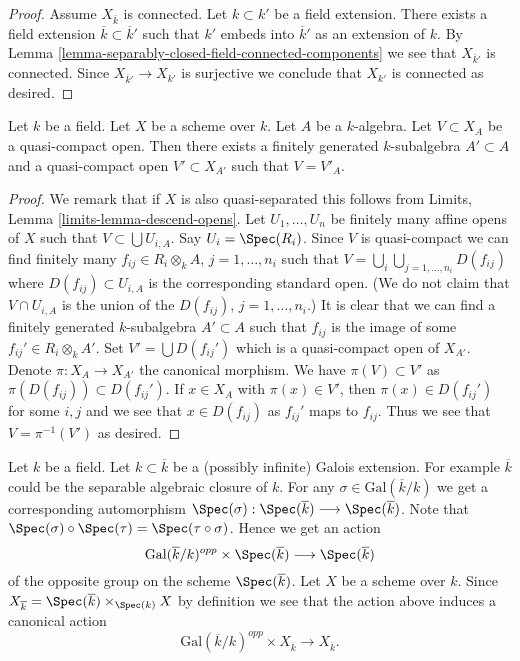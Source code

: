 \begin{proof}
Assume $X_{\overline{k}}$ is connected.
Let $k \subset k'$ be a field extension.
There exists a field extension $\overline{k} \subset \overline{k}'$
such that $k'$ embeds into $\overline{k}'$ as an extension of $k$.
By Lemma \ref{lemma-separably-closed-field-connected-components}
we see that $X_{\overline{k}'}$ is connected.
Since $X_{\overline{k}'} \to X_{k'}$ is surjective we conclude
that $X_{k'}$ is connected as desired.
\end{proof}

\begin{lemma}
\label{lemma-descend-open}
Let $k$ be a field.
Let $X$ be a scheme over $k$.
Let $A$ be a $k$-algebra.
Let $V \subset X_A$ be a quasi-compact open.
Then there exists a finitely generated $k$-subalgebra $A' \subset A$
and a quasi-compact open $V' \subset X_{A'}$
such that $V = V'_A$.
\end{lemma}

\begin{proof}
We remark that if $X$ is also quasi-separated this follows from
Limits, Lemma \ref{limits-lemma-descend-opens}. Let
$U_1, \ldots, U_n$ be finitely many affine opens of $X$
such that $V \subset \bigcup U_{i, A}$. Say $U_i = \Spec(R_i)$.
Since $V$ is quasi-compact we can find finitely many
$f_{ij} \in R_i \otimes_k A$, $j = 1, \ldots, n_i$
such that $V = \bigcup_i \bigcup_{j = 1, \ldots, n_i} D(f_{ij})$
where $D(f_{ij}) \subset U_{i, A}$ is the corresponding standard
open. (We do not claim that $V \cap U_{i, A}$ is the union
of the $D(f_{ij})$, $j = 1, \ldots, n_i$.)
It is clear that we can find a finitely generated $k$-subalgebra
$A' \subset A$ such that $f_{ij}$ is the image of some
$f_{ij}' \in R_i \otimes_k A'$.
Set $V' = \bigcup D(f_{ij}')$ which is a quasi-compact open of $X_{A'}$.
Denote $\pi : X_A \to X_{A'}$ the canonical morphism.
We have $\pi(V) \subset V'$ as $\pi(D(f_{ij})) \subset D(f_{ij}')$.
If $x \in X_A$ with $\pi(x) \in V'$, then $\pi(x) \in D(f_{ij}')$
for some $i, j$ and we see that $x \in D(f_{ij})$ as $f_{ij}'$
maps to $f_{ij}$. Thus we see that $V = \pi^{-1}(V')$ as desired.
\end{proof}

\noindent
Let $k$ be a field. Let $k \subset \overline{k}$ be a (possibly infinite)
Galois extension. For example $\overline{k}$ could be the
separable algebraic closure of $k$.
For any $\sigma \in \text{Gal}(\overline{k}/k)$ we get a corresponding
automorphism
$
\Spec(\sigma) :
\Spec(\overline{k})
\longrightarrow
\Spec(\overline{k})
$.
Note that
$\Spec(\sigma) \circ \Spec(\tau) = \Spec(\tau \circ \sigma)$.
Hence we get an action
$$
\text{Gal}(\overline{k}/k)^{opp} \times \Spec(\overline{k})
\longrightarrow
\Spec(\overline{k})
$$
of the opposite group on the scheme $\Spec(\overline{k})$.
Let $X$ be a scheme over $k$. Since
$X_{\overline{k}} =
\Spec(\overline{k}) \times_{\Spec(k)} X$
by definition we see that the action above induces a canonical action
\begin{equation}
\label{equation-galois-action-base-change-kbar}
\text{Gal}(\overline{k}/k)^{opp} \times X_{\overline{k}}
\longrightarrow
X_{\overline{k}}.
\end{equation}

